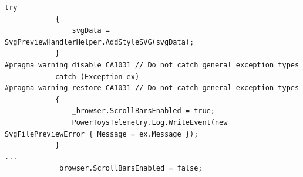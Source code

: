 \documentclass[a4paper,fleqn,12pt]{JMThesis}
\newcommand{\latin}{\fontencoding{T1}\selectfont}
\theoremstyle{plain}
\theoremstyle{definition}
\begin{document}
{\latin
\begin{center}
    \begin{lstlisting}[caption={\latin src/modules/previewpane/SvgPreviewHandler/SvgPreviewControl.cs }]
            try
            {
                svgData = SvgPreviewHandlerHelper.AddStyleSVG(svgData);
            }
#pragma warning disable CA1031 // Do not catch general exception types
            catch (Exception ex)
#pragma warning restore CA1031 // Do not catch general exception types
            {
                _browser.ScrollBarsEnabled = true;
                PowerToysTelemetry.Log.WriteEvent(new SvgFilePreviewError { Message = ex.Message });
            }
...
            _browser.ScrollBarsEnabled = false;
    \end{lstlisting}
\end{center}
}
\end{document}
